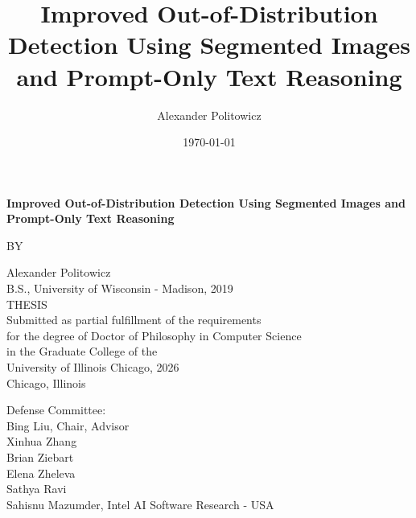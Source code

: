 \documentclass[12pt,reqno,oneside]{amsbook}
\theoremstyle{definition}
\newcommand{\?}{\stackrel{?}{=}}
\begin{document}
\newcommand{\thetitle}{Improved Out-of-Distribution Detection Using Segmented Images and Prompt-Only Text Reasoning}

\newcommand{\institution}{University of Illinois Chicago} 
\newcommand{\degree}{Doctor of Philosophy}
\newcommand{\programname}{Computer Science}
\newcommand{\committee}{Bing Liu, Chair, Advisor \\ Xinhua Zhang \\ Brian Ziebart \\ Elena Zheleva \\ Sathya Ravi \\ Sahisnu Mazumder, Intel AI Software Research - USA}
\newcommand{\theauthor}{Alexander Politowicz}
\newcommand{\priordegrees}{B.S., University of Wisconsin - Madison, 2019}
\newcommand{\graduationyear}{2026}

\author{\theauthor}
\title{\thetitle}
\date{\today}

\frontmatter

\begin{titlepage}
    \centering
	{{\Large {\textbf{\thetitle}}}  \par}
    \vspace{2cm}
    {BY\par}
    \vspace{0.5cm}
    {\theauthor}\\
    {\priordegrees}\\
    \vspace{2cm}
	THESIS\\
	\vspace{1cm}
	Submitted as partial fulfillment of the requirements\\ \vspace{0.2cm}
	for the degree of {\degree} in {\programname} \\ \vspace{0.2cm}
	in the Graduate College of the \\  \vspace{0.2cm}
	University of Illinois Chicago, {\graduationyear}\\
	\vspace{1cm}
	Chicago, Illinois
		
	\raggedright
    \vfill
    Defense Committee: \\
    \committee \\
\end{titlepage}
\end{document}
